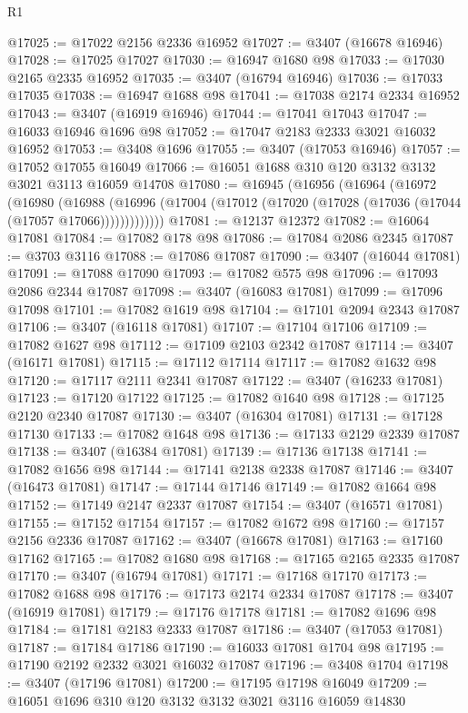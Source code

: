 \begin{lexlean}{R1}
\begin{coremodule}
@17025 := @17022 @2156 @2336 @16952
@17027 := @3407 (@16678 @16946)
@17028 := @17025 @17027
@17030 := @16947 @1680 @98
@17033 := @17030 @2165 @2335 @16952
@17035 := @3407 (@16794 @16946)
@17036 := @17033 @17035
@17038 := @16947 @1688 @98
@17041 := @17038 @2174 @2334 @16952
@17043 := @3407 (@16919 @16946)
@17044 := @17041 @17043
@17047 := @16033 @16946 @1696 @98
@17052 := @17047 @2183 @2333 @3021 @16032 @16952
@17053 := @3408 @1696
@17055 := @3407 (@17053 @16946)
@17057 := @17052 @17055 @16049
@17066 := @16051 @1688 @310 @120 @3132 @3132 @3021 @3113 @16059 @14708
@17080 := @16945
    (@16956
      (@16964
        (@16972
          (@16980
            (@16988
              (@16996 (@17004 (@17012 (@17020 (@17028 (@17036 (@17044 (@17057 @17066)))))))))))))
@17081 := @12137 @12372
@17082 := @16064 @17081
@17084 := @17082 @178 @98
@17086 := @17084 @2086 @2345
@17087 := @3703 @3116
@17088 := @17086 @17087
@17090 := @3407 (@16044 @17081)
@17091 := @17088 @17090
@17093 := @17082 @575 @98
@17096 := @17093 @2086 @2344 @17087
@17098 := @3407 (@16083 @17081)
@17099 := @17096 @17098
@17101 := @17082 @1619 @98
@17104 := @17101 @2094 @2343 @17087
@17106 := @3407 (@16118 @17081)
@17107 := @17104 @17106
@17109 := @17082 @1627 @98
@17112 := @17109 @2103 @2342 @17087
@17114 := @3407 (@16171 @17081)
@17115 := @17112 @17114
@17117 := @17082 @1632 @98
@17120 := @17117 @2111 @2341 @17087
@17122 := @3407 (@16233 @17081)
@17123 := @17120 @17122
@17125 := @17082 @1640 @98
@17128 := @17125 @2120 @2340 @17087
@17130 := @3407 (@16304 @17081)
@17131 := @17128 @17130
@17133 := @17082 @1648 @98
@17136 := @17133 @2129 @2339 @17087
@17138 := @3407 (@16384 @17081)
@17139 := @17136 @17138
@17141 := @17082 @1656 @98
@17144 := @17141 @2138 @2338 @17087
@17146 := @3407 (@16473 @17081)
@17147 := @17144 @17146
@17149 := @17082 @1664 @98
@17152 := @17149 @2147 @2337 @17087
@17154 := @3407 (@16571 @17081)
@17155 := @17152 @17154
@17157 := @17082 @1672 @98
@17160 := @17157 @2156 @2336 @17087
@17162 := @3407 (@16678 @17081)
@17163 := @17160 @17162
@17165 := @17082 @1680 @98
@17168 := @17165 @2165 @2335 @17087
@17170 := @3407 (@16794 @17081)
@17171 := @17168 @17170
@17173 := @17082 @1688 @98
@17176 := @17173 @2174 @2334 @17087
@17178 := @3407 (@16919 @17081)
@17179 := @17176 @17178
@17181 := @17082 @1696 @98
@17184 := @17181 @2183 @2333 @17087
@17186 := @3407 (@17053 @17081)
@17187 := @17184 @17186
@17190 := @16033 @17081 @1704 @98
@17195 := @17190 @2192 @2332 @3021 @16032 @17087
@17196 := @3408 @1704
@17198 := @3407 (@17196 @17081)
@17200 := @17195 @17198 @16049
@17209 := @16051 @1696 @310 @120 @3132 @3132 @3021 @3116 @16059 @14830

\end{coremodule}
\end{lexlean}
